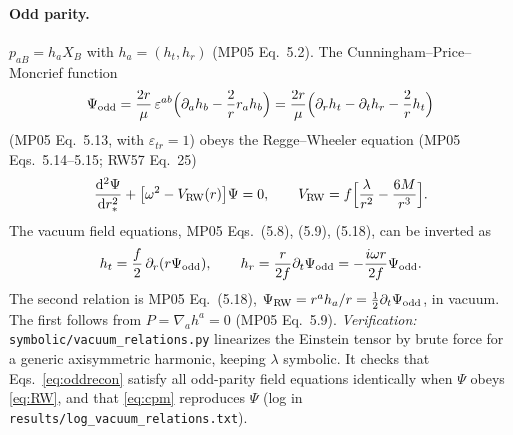 \documentclass[11pt,a4paper]{article}
\numberwithin{equation}{section}
\newcommand{\dd}{\mathrm{d}}
\begin{document}
\paragraph{Odd parity.} $p_{aB}=h_aX_B$ with $h_a=(h_t,h_r)$ (MP05 Eq.~5.2). The Cunningham--Price--Moncrief
function
\begin{equation}
\Psi_{\rm odd}=\frac{2r}{\mu}\,\varepsilon^{ab}\Big(\partial_ah_b-\frac2r r_ah_b\Big)
=\frac{2r}{\mu}\Big(\partial_rh_t-\partial_th_r-\frac2rh_t\Big)
\label{eq:cpm}
\end{equation}
(MP05 Eq.~5.13, with $\varepsilon_{tr}=1$) obeys the Regge--Wheeler equation (MP05 Eqs.~5.14--5.15; RW57 Eq.~25)
\begin{equation}
\frac{\dd^2\Psi}{\dd r_*^2}+\big[\omega^2-V_{\rm RW}(r)\big]\Psi=0,\qquad
V_{\rm RW}=f\Big[\frac{\lambda}{r^2}-\frac{6M}{r^3}\Big].
\label{eq:RW}
\end{equation}
The vacuum field equations, MP05 Eqs.~(5.8), (5.9), (5.18), can be inverted as
\begin{equation}
h_t=\frac f2\,\partial_r(r\Psi_{\rm odd}),\qquad h_r=\frac{r}{2f}\partial_t\Psi_{\rm odd}=-\frac{i\omega r}{2f}\Psi_{\rm odd}.
\label{eq:oddrecon}
\end{equation}
The second relation is MP05 Eq.~(5.18), $\Psi_{\rm RW}=r^ah_a/r=\tfrac12\partial_t\Psi_{\rm odd}$, in vacuum. The
first follows from $P=\nabla_ah^a=0$ (MP05 Eq.~5.9). \emph{Verification:}
\texttt{symbolic/vacuum\_relations.py} linearizes the Einstein tensor by brute force for a generic
axisymmetric harmonic, keeping $\lambda$ symbolic. It checks that Eqs.~\eqref{eq:oddrecon} satisfy all
odd-parity field equations identically when $\Psi$ obeys \eqref{eq:RW}, and that \eqref{eq:cpm} reproduces
$\Psi$ (log in \texttt{results/log\_vacuum\_relations.txt}).
\end{document}
